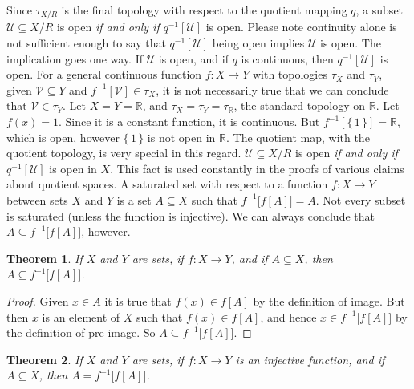 \documentclass{article}
\theoremstyle{plain}
\newtheorem{theorem}{Theorem}[section]
\theoremstyle{normal}
\newenvironment{definition}{%
    \pushQED{\qed}\renewcommand{\qedsymbol}{$\blacksquare$}\definitionx%
}{%
    \popQED\enddefinitionx%
}
\begin{document}
        Since $\tau_{X/R}$ is the final topology with respect to the quotient
        mapping $q$, a subset $\mathcal{U}\subseteq{X}/R$ is open
        \textit{if and only if} $q^{-1}[\mathcal{U}]$ is open.
        Please note continuity alone is not sufficient enough to say that
        $q^{-1}[\mathcal{U}]$ being open implies $\mathcal{U}$ is open. The
        implication goes one way. If $\mathcal{U}$ is open, and if $q$ is
        continuous, then $q^{-1}[\mathcal{U}]$ is open. For a general continuous
        function $f:X\rightarrow{Y}$ with topologies $\tau_{X}$ and $\tau_{Y}$,
        given $\mathcal{V}\subseteq{Y}$ and $f^{-1}[\mathcal{V}]\in\tau_{X}$, it
        is not necessarily true that we can conclude that
        $\mathcal{V}\in\tau_{Y}$. Let $X=Y=\mathbb{R}$, and
        $\tau_{X}=\tau_{Y}=\tau_{\mathbb{R}}$, the standard topology on
        $\mathbb{R}$. Let $f(x)=1$. Since it is a constant function, it is
        continuous. But $f^{-1}[\{\,1\,\}]=\mathbb{R}$, which is open, however
        $\{\,1\,\}$ is not open in $\mathbb{R}$.
        The quotient map, with the quotient topology, is very special in this
        regard. $\mathcal{U}\subseteq{X}/R$ is open \textit{if and only if}
        $q^{-1}[\mathcal{U}]$ is open in $X$. This fact is used constantly in
        the proofs of various claims about quotient spaces.
        \begin{definition}[\textbf{Saturated Subset}]
            A saturated set with respect to a function $f:X\rightarrow{Y}$
            between sets $X$ and $Y$ is a set $A\subseteq{X}$ such that
            $f^{-1}\big[f[A]\big]=A$. 
        \end{definition}
        Not every subset is saturated (unless the function is injective).
        We can always conclude that $A\subseteq{f}^{-1}\big[f[A]\big]$, however.
        \begin{theorem}
            If $X$ and $Y$ are sets, if $f:X\rightarrow{Y}$, and if
            $A\subseteq{X}$, then $A\subseteq{f}^{-1}\big[f[A]\big]$.
        \end{theorem}
        \begin{proof}
            Given $x\in{A}$ it is true that $f(x)\in{f}[A]$ by the definition
            of image. But then $x$ is an element of $X$ such that
            $f(x)\in{f}[A]$, and hence $x\in{f}^{-1}\big[f[A]\big]$ by the
            definition of pre-image. So $A\subseteq{f}^{-1}\big[f[A]\big]$.
        \end{proof}
        \begin{theorem}
            If $X$ and $Y$ are sets, if $f:X\rightarrow{Y}$ is an injective
            function, and if $A\subseteq{X}$, then $A=f^{-1}\big[f[A]\big]$.
        \end{theorem}
\end{document}
